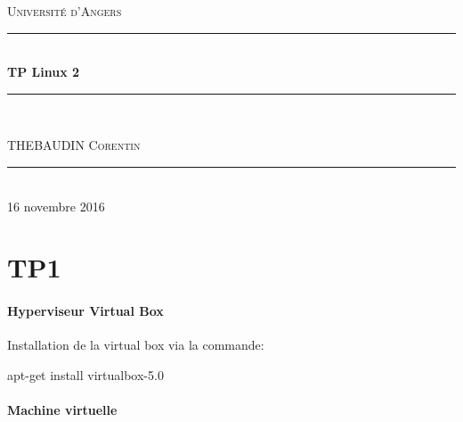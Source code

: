 \documentclass[a4paper,12pt]{article}
\newcommand{\HRule}{\rule{\linewidth}{0.5mm}}
\begin{document}
\begin{titlepage}
  \begin{sffamily}
  \begin{center}


    \textsc{\LARGE Université d'Angers}\\[2cm]

   

    \HRule \\[0.4cm]
    { \huge \bfseries TP Linux 2}
    \HRule \\[2cm]
    

    \begin{minipage}{0.4\textwidth}
      \begin{flushleft} \large
        THEBAUDIN \textsc{Corentin}\\
      \end{flushleft}
    \end{minipage}
    

    \vfill
    \HRule\\[2cm]
    {\large 16 novembre 2016}

  \end{center}
  \end{sffamily}
\end{titlepage}
\clearpage

\tableofcontents

\clearpage



\section{TP1}
\paragraph{Hyperviseur Virtual Box}

Installation de la virtual box via la commande:

apt-get install virtualbox-5.0

\paragraph{Machine virtuelle}
\end{document}
